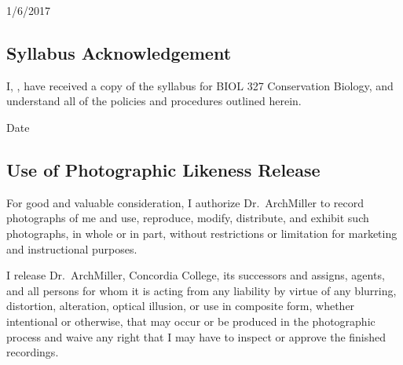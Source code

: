 \documentclass{tufte-handout}
\begin{document}
\begin{fullwidth}
\begin{calendar}{1/6/20}{17}






  \end{calendar}



\end{fullwidth}



\newpage

\subsection{Syllabus Acknowledgement}

I, \underline{\hspace{5cm}}, have received a copy of the syllabus for BIOL 327 Conservation Biology, and understand all of the policies and procedures outlined herein. 

  \underline{\hspace{5cm}} {Date}  \hrulefill


\subsection{Use of Photographic Likeness Release}

For good and valuable consideration, I authorize Dr.~ArchMiller to record photographs of me and use, reproduce, modify, distribute, and exhibit such photographs, in whole or in part, without restrictions or limitation for marketing and instructional purposes. 

I release Dr.~ArchMiller, Concordia College, its successors and assigns, agents, and all persons for whom it is acting from any liability by virtue of any blurring, distortion, alteration, optical illusion, or use in composite form, whether intentional or otherwise, that may occur or be produced in the photographic process and waive any right that I may have to inspect or approve the finished recordings.
\end{document}
